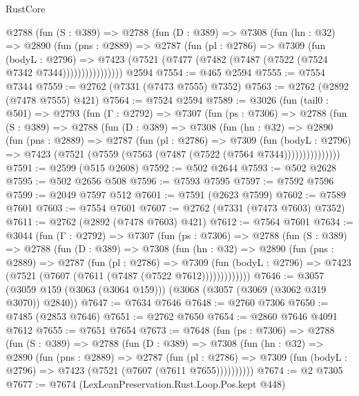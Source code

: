 \begin{lexlean}{RustCore}
\begin{coremodule}
          @2788
            (fun (S : @389) =>
            @2788
              (fun (D : @389) =>
              @7308
                (fun (hn : @32) =>
                @2890
                  (fun (pns : @2889) =>
                  @2787
                    (fun (pl : @2786) =>
                    @7309
                      (fun (bodyL : @2796) =>
                      @7423 (@7521 (@7477 (@7482 (@7487 (@7522 (@7524 @7342 @7344))))))))))))))))
    @2594
@7554 := @465 @2594
@7555 := @7554 @7344
@7559 := @2762 (@7331 (@7473 @7555) @7352)
@7563 := @2762 (@2892 (@7478 @7555) @421)
@7564 := @7524 @2594
@7589 := @3026
    (fun (tail0 : @501) =>
    @2793
      (fun (Γ : @2792) =>
      @7307
        (fun (ps : @7306) =>
        @2788
          (fun (S : @389) =>
          @2788
            (fun (D : @389) =>
            @7308
              (fun (hn : @32) =>
              @2890
                (fun (pns : @2889) =>
                @2787
                  (fun (pl : @2786) =>
                  @7309
                    (fun (bodyL : @2796) =>
                    @7423 (@7521 (@7559 (@7563 (@7487 (@7522 (@7564 @7344)))))))))))))))
@7591 := @2599 (@515 @2608)
@7592 := @502 @2644
@7593 := @502 @2628
@7595 := @502 @2656 @508
@7596 := @7593 @7595
@7597 := @7592 @7596
@7599 := @2049 @7597 @512
@7601 := @7591 (@2623 @7599)
@7602 := @7589 @7601
@7603 := @7554 @7601
@7607 := @2762 (@7331 (@7473 @7603) @7352)
@7611 := @2762 (@2892 (@7478 @7603) @421)
@7612 := @7564 @7601
@7634 := @3044
    (fun (Γ : @2792) =>
    @7307
      (fun (ps : @7306) =>
      @2788
        (fun (S : @389) =>
        @2788
          (fun (D : @389) =>
          @7308
            (fun (hn : @32) =>
            @2890
              (fun (pns : @2889) =>
              @2787
                (fun (pl : @2786) =>
                @7309
                  (fun (bodyL : @2796) =>
                  @7423 (@7521 (@7607 (@7611 (@7487 (@7522 @7612)))))))))))))
@7646 := @3057 (@3059 @159 (@3063 (@3064 @159))) (@3068 (@3057 (@3069 (@3062 @319 @3070)) @2840))
@7647 := @7634 @7646
@7648 := @2760 @7306
@7650 := @7485 (@2853 @7646)
@7651 := @2762 @7650
@7654 := @2860 @7646 @4091 @7612
@7655 := @7651 @7654
@7673 := @7648
    (fun (ps : @7306) =>
    @2788
      (fun (S : @389) =>
      @2788
        (fun (D : @389) =>
        @7308
          (fun (hn : @32) =>
          @2890
            (fun (pns : @2889) =>
            @2787
              (fun (pl : @2786) =>
              @7309 (fun (bodyL : @2796) => @7423 (@7521 (@7607 (@7611 @7655))))))))))
@7674 := @2 @7305
@7677 := @7674 (LexLeanPreservation.Rust.Loop.Pos.kept @448)

\end{coremodule}
\end{lexlean}
